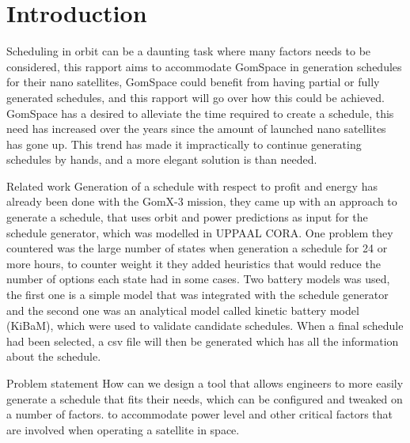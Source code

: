 \chapter{Introduction}\label{cha:intro}
Scheduling in orbit can be a daunting task where many factors needs to be considered, this rapport aims to accommodate GomSpace in generation schedules for their nano satellites, GomSpace could benefit from having partial or fully generated schedules, and this rapport will go over how this could be achieved. GomSpace has a desired to alleviate the time required to create a schedule, this need has increased over the years since the amount of launched nano satellites has gone up. This trend has made it impractically to continue generating schedules by hands, and a more elegant solution is than needed.

Related work %
Generation of a schedule with respect to profit and energy has already been done with the GomX-3 mission, they came up with an approach to generate a schedule, that uses orbit and power predictions as input for the schedule generator, which was modelled in UPPAAL CORA. One problem they countered was the large number of states when generation a schedule for 24 or more hours, to counter weight it they added heuristics that would reduce the number of options each state had in some cases. Two battery models was used, the first one is a simple model that was integrated with the schedule generator and the second one was an analytical model called kinetic battery model (KiBaM), which were used to validate candidate schedules. When a final schedule had been selected, a csv file will then be generated which has all the information about the schedule.

Problem statement
How can we design a tool that allows engineers to more easily generate a schedule that fits their needs, which can be configured and tweaked on a number of factors. to accommodate power level and other critical factors that are involved when operating a satellite in space.



	



